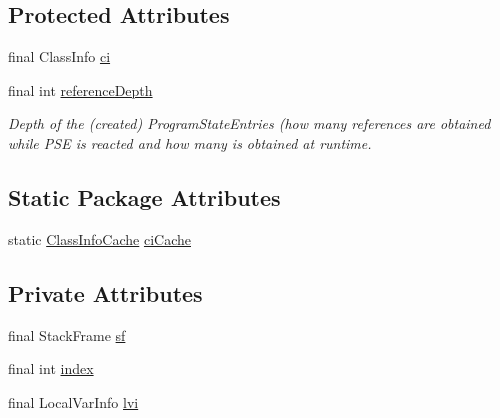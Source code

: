 \subsection*{Protected Attributes}
\begin{DoxyCompactItemize}
\item 
final Class\+Info \hyperlink{classgov_1_1nasa_1_1jpf_1_1inspector_1_1server_1_1programstate_1_1_state_value_a0eb4aa1e630ed6372dcfb8c41ae7edc5}{ci}
\item 
final int \hyperlink{classgov_1_1nasa_1_1jpf_1_1inspector_1_1server_1_1programstate_1_1_state_node_a55683618625dae46e8aa68d95811d6bb}{reference\+Depth}
\begin{DoxyCompactList}\small\item\em Depth of the (created) Program\+State\+Entries (how many references are obtained while P\+SE is reacted and how many is obtained at runtime. \end{DoxyCompactList}\end{DoxyCompactItemize}
\subsection*{Static Package Attributes}
\begin{DoxyCompactItemize}
\item 
static \hyperlink{classgov_1_1nasa_1_1jpf_1_1inspector_1_1utils_1_1_class_info_cache}{Class\+Info\+Cache} \hyperlink{classgov_1_1nasa_1_1jpf_1_1inspector_1_1server_1_1programstate_1_1_state_value_a38182b5018580765f3f2cdc9e96e1ca2}{ci\+Cache}
\end{DoxyCompactItemize}
\subsection*{Private Attributes}
\begin{DoxyCompactItemize}
\item 
final Stack\+Frame \hyperlink{classgov_1_1nasa_1_1jpf_1_1inspector_1_1server_1_1programstate_1_1_state_value_stack_slot_afc660da35cfea1fff267b7b97be87321}{sf}
\item 
final int \hyperlink{classgov_1_1nasa_1_1jpf_1_1inspector_1_1server_1_1programstate_1_1_state_value_stack_slot_aaa652f9cedf942095d9f6966cc2ebe3d}{index}
\item 
final Local\+Var\+Info \hyperlink{classgov_1_1nasa_1_1jpf_1_1inspector_1_1server_1_1programstate_1_1_state_value_stack_slot_a3f0fe3589b9a0511defcdce9502be964}{lvi}
\end{DoxyCompactItemize}


